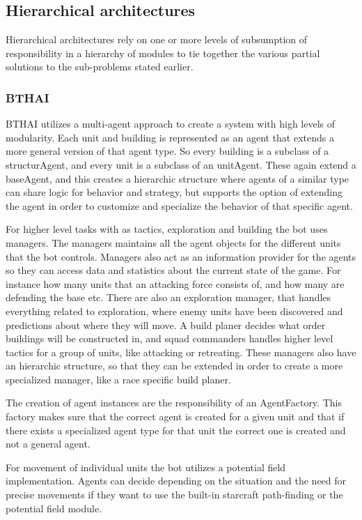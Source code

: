 \subsection{Hierarchical architectures}
Hierarchical architectures rely on one or more levels of subsumption of
responsibility in a hierarchy of modules to tie together the various partial
solutions to the sub-problems stated earlier.

\subsubsection{BTHAI}
BTHAI utilizes a multi-agent approach to create a system with high levels of modularity. Each unit and building is represented as an agent that extends a more general version of that agent type. So every building is a subclass of a structurAgent, and every unit is a subclass of an unitAgent. These again extend a baseAgent, and this creates a hierarchic structure where agents of a similar type can share logic for behavior and strategy, but supports the option of extending the agent in order to customize and specialize the behavior of that specific agent. 

For higher level tasks with as tactics, exploration and building the bot uses managers. The managers maintains all the agent objects for the different units that the bot controls. Managers also act as an information provider for the agents so they can access data and statistics about the current state of the game. For instance how many units that an attacking force consists of, and how many are defending the base etc. 
There are also an exploration manager, that handles everything related to exploration, where enemy units have been discovered and predictions about where they will move. A build planer decides what order buildings will be constructed in, and squad commanders handles higher level tactics for a group of units, like attacking or retreating. These managers also have an hierarchic structure, so that they can be extended in order to create a more specialized manager, like a race specific build planer. 

The creation of agent instances are the responsibility of an AgentFactory. This factory makes sure that the correct agent is created for a given unit and that if there exists a specialized agent type for that unit the correct one is created and not a general agent. 

For movement of individual units the bot utilizes a potential field implementation. Agents can decide depending on the situation and the need for precise movements if they want to use the built-in starcraft path-finding or the potential field module. 

